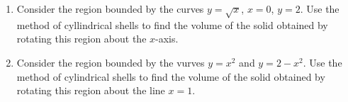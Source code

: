 \begin{enumerate}
\item Consider the region bounded by the curves $y=\sqrt{x}$, $x=0$, $y=2$. Use the method of cyllindrical shells to find the volume of
the solid obtained by rotating this region about the $x$-axis. 
\answer{$8\pi$}
\item Consider the region bounded by the vurves $y=x^2$ and $y=2-x^2$. Use the method of cylindrical shells to find the volume of the solid obtained by rotating this region about the line $x=1$.
\end{enumerate}
